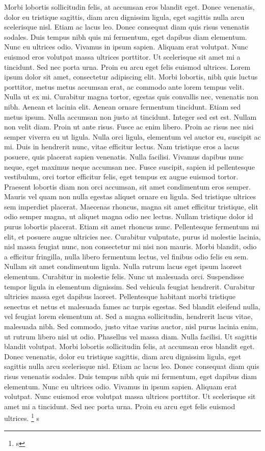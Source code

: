 {Morbi lobortis sollicitudin felis, at accumsan eros blandit eget. Donec venenatis, dolor eu tristique sagittis, diam arcu dignissim ligula, eget sagittis nulla arcu scelerisque nisl. Etiam ac lacus leo. Donec consequat diam quis risus venenatis sodales. Duis tempus nibh quis mi fermentum, eget dapibus diam elementum. Nunc eu ultrices odio. Vivamus in ipsum sapien. Aliquam erat volutpat. Nunc euismod eros volutpat massa ultrices porttitor. Ut scelerisque sit amet mi a tincidunt. Sed nec porta urna. Proin eu arcu eget felis euismod ultrices.
 Lorem ipsum dolor sit amet, consectetur adipiscing elit. Morbi lobortis, nibh quis luctus porttitor, metus metus accumsan erat, ac commodo ante lorem tempus velit. Nulla ut ex mi. Curabitur magna tortor, egestas quis convallis nec, venenatis non nibh. Aenean et lacinia elit. Aenean ornare fermentum tincidunt. Etiam sed metus ipsum. Nulla accumsan non justo at tincidunt. Integer sed est est. Nullam non velit diam. Proin ut ante risus. Fusce ac enim libero. Proin ac risus nec nisi semper viverra eu ut ligula. Nulla orci ligula, elementum vel auctor eu, suscipit ac mi. Duis in hendrerit nunc, vitae efficitur lectus. Nam tristique eros a lacus posuere, quis placerat sapien venenatis.
Nulla facilisi. Vivamus dapibus nunc neque, eget maximus neque accumsan nec. Fusce suscipit, sapien id pellentesque vestibulum, orci tortor efficitur felis, eget tempus ex augue euismod tortor. Praesent lobortis diam non orci accumsan, sit amet condimentum eros semper. Mauris vel quam non nulla egestas aliquet ornare eu ligula. Sed tristique ultrices sem imperdiet placerat. Maecenas rhoncus, magna sit amet efficitur tristique, elit odio semper magna, ut aliquet magna odio nec lectus. Nullam tristique dolor id purus lobortis placerat.
Etiam sit amet rhoncus nunc. Pellentesque fermentum mi elit, et posuere augue ultricies nec. Curabitur vulputate, purus id molestie lacinia, nisl massa feugiat nunc, non consectetur mi nisi non mauris. Morbi blandit, odio a efficitur fringilla, nulla libero fermentum lectus, vel finibus odio felis eu sem. Nullam sit amet condimentum ligula. Nulla rutrum lacus eget ipsum laoreet elementum. Curabitur in molestie felis. Nunc ut malesuada orci.
Suspendisse tempor ligula in elementum dignissim. Sed vehicula feugiat hendrerit. Curabitur ultricies massa eget dapibus laoreet. Pellentesque habitant morbi tristique senectus et netus et malesuada fames ac turpis egestas. Sed blandit eleifend nulla, vel feugiat lorem elementum at. Sed a magna sollicitudin, hendrerit lacus vitae, malesuada nibh. Sed commodo, justo vitae varius auctor, nisl purus lacinia enim, ut rutrum libero nisl ut odio. Phasellus vel massa diam. Nulla facilisi. Ut sagittis blandit volutpat.
Morbi lobortis sollicitudin felis, at accumsan eros blandit eget. Donec venenatis, dolor eu tristique sagittis, diam arcu dignissim ligula, eget sagittis nulla arcu scelerisque nisl. Etiam ac lacus leo. Donec consequat diam quis risus venenatis sodales. Duis tempus nibh quis mi fermentum, eget dapibus diam elementum. Nunc eu ultrices odio. Vivamus in ipsum sapien. Aliquam erat volutpat. Nunc euismod eros volutpat massa ultrices porttitor. Ut scelerisque sit amet mi a tincidunt. Sed nec porta urna. Proin eu arcu eget felis euismod ultrices.
}\footnote{s}
s

\bye